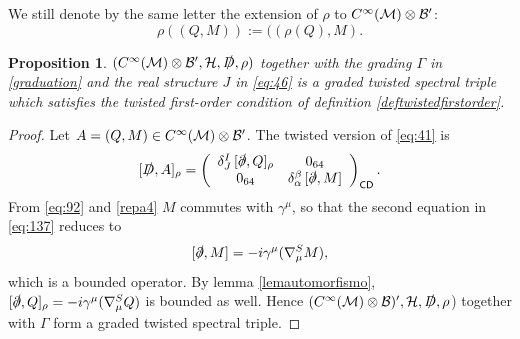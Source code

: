 \documentclass[11pt]{article}
\newcommand{\cinf}{{C^\infty({\cal M})}}
\newcommand{\HH}{\mathcal H}
\newcommand{\del}{\partial}
\newcommand{\partind}[1]{{\sf #1}}
\newtheorem{prop}{Proposition}[section]
\begin{document}
We still denote by the same
letter  the extension of $\rho$ to  $\cinf\otimes\cal B'$:
\begin{equation}
  \label{eq:91}
  \rho((Q, M)) := ((\rho(Q), M).
\end{equation}
\begin{prop}
\label{twisted-spec-triple}
  $(\cinf\otimes{\cal B}', \HH, \slashed D, \rho)$ together with the grading
  $\Gamma$ in \eqref{graduation} and the real structure $J$ in
  \eqref{eq:46} is a graded twisted spectral
  triple which satisfies the twisted first-order condition of
  definition \ref{deftwistedfirstorder}. 
\end{prop}
\begin{proof}
Let $A=(Q,M)\in\cinf\otimes {\cal B}'$. The twisted version of \eqref{eq:41} is
\begin{equation}
\label{eq:410}
   [\slashed D, A]_\rho =\left(
\begin{array}{cc}
 \delta^I_J \,[\slashed\del,  Q]_\rho&0_{64} \\ 
 0_{64} &\delta_\alpha^\beta\, [\slashed \del, M]
\end{array}
\right)_{\partind{CD}}. 
 \end{equation}
From \eqref{eq:92} and \eqref{repa4} $M$ commutes with $\gamma^\mu$,
so that the second equation in \eqref{eq:137} reduces to
\begin{equation}
\label{eq:410bis}
[\slashed \del, M]= -i\gamma^\mu (\nabla^S_\mu M),
  \end{equation}
which is a bounded operator. By lemma \ref{lemautomorfismo}, $[\slashed\del,  Q]_\rho = -i\gamma^\mu (\nabla_\mu^S Q)$
is bounded as well. Hence $(\cinf\otimes \cal B)', {\cal H}, \slashed
D, \rho$) together with $\Gamma$ form a graded twisted spectral
triple.  


\end{proof}
\end{document}
